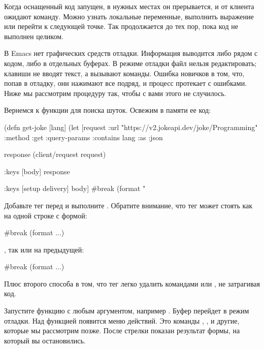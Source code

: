 Когда оснащенный код запущен, в нужных местах он прерывается, и от клиента ожидают команду. Можно узнать локальные переменные, выполнить выражение или перейти к следующей точке. Так продолжается до тех пор, пока код не выполнен целиком.

В Emacs нет графических средств отладки. Информация выводится либо рядом с кодом, либо в отдельных буферах. В режиме отладки файл нельзя редактировать; клавиши не вводят текст, а вызывают команды. Ошибка новичков в том, что, попав в отладку, они нажимают все подряд, и процесс протекает с ошибками. Ниже мы рассмотрим процедуру так, чтобы с вами этого не случилось.

Вернемся к функции  для поиска шуток. Освежим в памяти ее код:

\begin{english}
  \begin{clojure}
(defn get-joke [lang]
  (let [request
        {:url "https://v2.jokeapi.dev/joke/Programming"
         :method :get
         :query-params {:contains lang}
         :as :json}

        response
        (client/request request)

        {:keys [body]}
        response

        {:keys [setup delivery]}
        body]
    #break
    (format "%
  \end{clojure}
\end{english}

Добавьте тег  перед  и выполните . Обратите внимание, что тег может стоять как на одной строке с формой:

\begin{english}
  \begin{clojure}
#break (format ...)
  \end{clojure}
\end{english}

\noindent
, так или на предыдущей:

\begin{english}
  \begin{clojure}
#break
(format ...)
  \end{clojure}
\end{english}

Плюс второго способа в том, что тег легко удалить командами  или , не затрагивая код.

Запустите функцию с любым аргументом, например . Буфер перейдет в режим отладки. Над функцией появится меню действий. Это команды , ,  и другие, которые мы рассмотрим позже. После стрелки \code{=>} показан результат формы, на который вы остановились.

